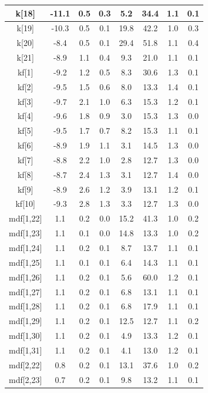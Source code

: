 \begin{longtable}{|c|c|c|c|c|c|c|c|}
\hline
k[18] & -11.1 & 0.5 & 0.3 & 5.2 & 34.4 & 1.1 & 0.1 \\
\hline
k[19] & -10.3 & 0.5 & 0.1 & 19.8 & 42.2 & 1.0 & 0.3 \\
\hline
k[20] & -8.4 & 0.5 & 0.1 & 29.4 & 51.8 & 1.1 & 0.4 \\
\hline
k[21] & -8.9 & 1.1 & 0.4 & 9.3 & 21.0 & 1.1 & 0.1 \\
\hline
kf[1] & -9.2 & 1.2 & 0.5 & 8.3 & 30.6 & 1.3 & 0.1 \\
\hline
kf[2] & -9.5 & 1.5 & 0.6 & 8.0 & 13.3 & 1.4 & 0.1 \\
\hline
kf[3] & -9.7 & 2.1 & 1.0 & 6.3 & 15.3 & 1.2 & 0.1 \\
\hline
kf[4] & -9.6 & 1.8 & 0.9 & 3.0 & 15.3 & 1.3 & 0.0 \\
\hline
kf[5] & -9.5 & 1.7 & 0.7 & 8.2 & 15.3 & 1.1 & 0.1 \\
\hline
kf[6] & -8.9 & 1.9 & 1.1 & 3.1 & 14.5 & 1.3 & 0.0 \\
\hline
kf[7] & -8.8 & 2.2 & 1.0 & 2.8 & 12.7 & 1.3 & 0.0 \\
\hline
kf[8] & -8.7 & 2.4 & 1.3 & 3.1 & 12.7 & 1.4 & 0.0 \\
\hline
kf[9] & -8.9 & 2.6 & 1.2 & 3.9 & 13.1 & 1.2 & 0.1 \\
\hline
kf[10] & -9.3 & 2.8 & 1.3 & 3.3 & 12.7 & 1.3 & 0.0 \\
\hline
mdf[1,22] & 1.1 & 0.2 & 0.0 & 15.2 & 41.3 & 1.0 & 0.2 \\
\hline
mdf[1,23] & 1.1 & 0.1 & 0.0 & 14.8 & 13.3 & 1.0 & 0.2 \\
\hline
mdf[1,24] & 1.1 & 0.2 & 0.1 & 8.7 & 13.7 & 1.1 & 0.1 \\
\hline
mdf[1,25] & 1.1 & 0.1 & 0.1 & 6.4 & 14.3 & 1.1 & 0.1 \\
\hline
mdf[1,26] & 1.1 & 0.2 & 0.1 & 5.6 & 60.0 & 1.2 & 0.1 \\
\hline
mdf[1,27] & 1.1 & 0.2 & 0.1 & 6.8 & 13.1 & 1.1 & 0.1 \\
\hline
mdf[1,28] & 1.1 & 0.2 & 0.1 & 6.8 & 17.9 & 1.1 & 0.1 \\
\hline
mdf[1,29] & 1.1 & 0.2 & 0.1 & 12.5 & 12.7 & 1.1 & 0.2 \\
\hline
mdf[1,30] & 1.1 & 0.2 & 0.1 & 4.9 & 13.3 & 1.2 & 0.1 \\
\hline
mdf[1,31] & 1.1 & 0.2 & 0.1 & 4.1 & 13.0 & 1.2 & 0.1 \\
\hline
mdf[2,22] & 0.8 & 0.2 & 0.1 & 13.1 & 37.6 & 1.0 & 0.2 \\
\hline
mdf[2,23] & 0.7 & 0.2 & 0.1 & 9.8 & 13.2 & 1.1 & 0.1 \\

\end{longtable}
